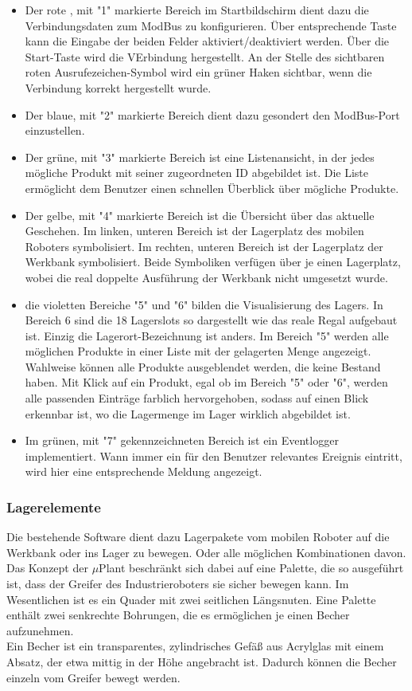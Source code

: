     \begin{itemize}
        \item Der rote , mit "1" markierte Bereich im Startbildschirm dient dazu die Verbindungsdaten zum ModBus zu konfigurieren. Über entsprechende Taste kann die Eingabe der beiden Felder aktiviert/deaktiviert werden. Über die Start-Taste wird die VErbindung hergestellt.
        An der Stelle des sichtbaren roten Ausrufezeichen-Symbol wird ein grüner Haken sichtbar, wenn die Verbindung korrekt hergestellt wurde.
        \item Der blaue, mit "2" markierte Bereich dient dazu gesondert den ModBus-Port einzustellen.
        \item Der grüne, mit "3" markierte Bereich ist eine Listenansicht, in der jedes mögliche Produkt mit seiner zugeordneten ID abgebildet ist.
        Die Liste ermöglicht dem Benutzer einen schnellen Überblick über mögliche Produkte.
        \item Der gelbe, mit "4" markierte Bereich ist die Übersicht über das aktuelle Geschehen. Im linken, unteren Bereich ist der Lagerplatz des mobilen Roboters symbolisiert.
        Im rechten, unteren Bereich ist der Lagerplatz der Werkbank symbolisiert. Beide Symboliken verfügen über je einen Lagerplatz, wobei die real doppelte Ausführung der Werkbank nicht umgesetzt wurde.
        \item die violetten Bereiche "5" und "6" bilden die Visualisierung des Lagers. In Bereich 6 sind die 18 Lagerslots so dargestellt wie das reale Regal aufgebaut ist. Einzig die Lagerort-Bezeichnung ist anders.
        Im Bereich "5" werden alle möglichen Produkte in einer Liste mit der gelagerten Menge angezeigt. Wahlweise können alle Produkte ausgeblendet werden, die keine Bestand haben.
        Mit Klick auf ein Produkt, egal ob im Bereich "5" oder "6", werden alle passenden Einträge farblich hervorgehoben, sodass auf einen Blick erkennbar ist, wo die Lagermenge im Lager wirklich abgebildet ist.
        \item Im grünen, mit "7" gekennzeichneten Bereich ist ein Eventlogger implementiert. Wann immer ein für den Benutzer relevantes Ereignis eintritt, wird hier eine entsprechende Meldung angezeigt.
    \end{itemize}
    \subsubsection{Lagerelemente}
    Die bestehende Software dient dazu Lagerpakete vom mobilen Roboter auf die Werkbank oder ins Lager zu bewegen. Oder alle möglichen Kombinationen davon.
    Das Konzept der $\mu$Plant beschränkt sich dabei auf eine Palette, die so ausgeführt ist, dass der Greifer des Industrieroboters sie sicher bewegen kann. Im Wesentlichen ist es ein Quader mit zwei seitlichen Längsnuten.
    Eine Palette enthält zwei senkrechte Bohrungen, die es ermöglichen je einen Becher aufzunehmen.\\
    Ein Becher ist ein transparentes, zylindrisches Gefäß aus Acrylglas mit einem Absatz, der etwa mittig in der Höhe angebracht ist. Dadurch können die Becher einzeln vom Greifer bewegt werden.

